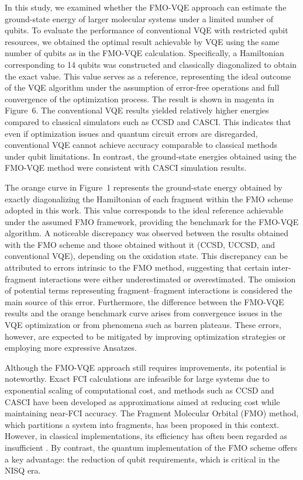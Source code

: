 \documentclass[pdflatex,sn-mathphys-num]{sn-jnl}%
\theoremstyle{thmstyleone}%
\theoremstyle{thmstyletwo}%
\theoremstyle{thmstylethree}%
\begin{document}
In this study, we examined whether the FMO-VQE approach can estimate the ground-state energy of larger molecular systems under a limited number of qubits. To evaluate the performance of conventional VQE with restricted qubit resources, we obtained the optimal result achievable by VQE using the same number of qubits as in the FMO-VQE calculation. Specifically, a Hamiltonian corresponding to 14 qubits was constructed and classically diagonalized to obtain the exact value. This value serves as a reference, representing the ideal outcome of the VQE algorithm under the assumption of error-free operations and full convergence of the optimization process. The result is shown in magenta in Figure~6. The conventional VQE results yielded relatively higher energies compared to classical simulators such as CCSD and CASCI. This indicates that even if optimization issues and quantum circuit errors are disregarded, conventional VQE cannot achieve accuracy comparable to classical methods under qubit limitations. In contrast, the ground-state energies obtained using the FMO-VQE method were consistent with CASCI simulation results.

The orange curve in Figure~1 represents the ground-state energy obtained by exactly diagonalizing the Hamiltonian of each fragment within the FMO scheme adopted in this work. This value corresponds to the ideal reference achievable under the assumed FMO framework, providing the benchmark for the FMO-VQE algorithm. A noticeable discrepancy was observed between the results obtained with the FMO scheme and those obtained without it (CCSD, UCCSD, and conventional VQE), depending on the oxidation state. This discrepancy can be attributed to errors intrinsic to the FMO method, suggesting that certain inter-fragment interactions were either underestimated or overestimated. The omission of potential terms representing fragment–fragment interactions is considered the main source of this error. Furthermore, the difference between the FMO-VQE results and the orange benchmark curve arises from convergence issues in the VQE optimization or from phenomena such as barren plateaus. These errors, however, are expected to be mitigated by improving optimization strategies or employing more expressive Ansatzes.

Although the FMO-VQE approach still requires improvements, its potential is noteworthy. Exact FCI calculations are infeasible for large systems due to exponential scaling of computational cost, and methods such as CCSD and CASCI have been developed as approximations aimed at reducing cost while maintaining near-FCI accuracy. The Fragment Molecular Orbital (FMO) method, which partitions a system into fragments, has been proposed in this context. However, in classical implementations, its efficiency has often been regarded as insufficient \cite{FMO10}. By contrast, the quantum implementation of the FMO scheme offers a key advantage: the reduction of qubit requirements, which is critical in the NISQ era.
\end{document}
